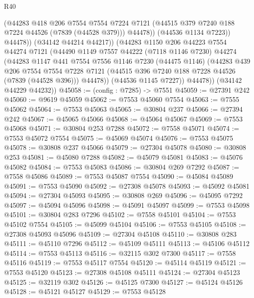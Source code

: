 \begin{lexlean}{R40}
\begin{coremodule}
                  (@44283
                    @418
                    @206
                    @7554
                    @7554
                    @7224
                    @7121
                    (@44515 @379 @7240 @188 @7224 @44526 (@7839 (@44528 @379)))
                    @44478))
                (@44536 @1134 @7223))
              @44478))
          (@34142 @44214 @44217))
        (@44283
          @1150
          @206
          @44223
          @7554
          @44274
          @7121
          (@44490
            @1149
            @7557
            @44222
            (@7118 @1146 @7230)
            @44274
            (@44283
              @1147
              @441
              @7554
              @7556
              @1146
              @7230
              (@44475 @1146)
              (@44283
                @439
                @206
                @7554
                @7554
                @7228
                @7121
                (@44515 @396 @7240 @188 @7228 @44526 (@7839 (@44528 @396)))
                @44478))
            (@44536 @1145 @7227))
          @44478))
      (@34142 @44229 @44232))
@45058 := (config : @7285) -> @7551
@45059 := @27391 @242
@45060 := @9619 @45059
@45062 := @7553 @45060 @7554
@45063 := @7555 @45062
@45064 := @7553 @45063
@45065 := @30804 @237
@45066 := @27394 @242
@45067 := @45065 @45066
@45068 := @45064 @45067
@45069 := @7553 @45068
@45071 := @30804 @253 @7288
@45072 := @7558 @45071
@45074 := @7553 @45072 @7554
@45075 := @45069 @45074
@45076 := @7553 @45075
@45078 := @30808 @237 @45066
@45079 := @27304 @45078
@45080 := @30808 @253
@45081 := @45080 @7288
@45082 := @45079 @45081
@45083 := @45076 @45082
@45084 := @7553 @45083
@45086 := @30804 @269 @7292
@45087 := @7558 @45086
@45089 := @7553 @45087 @7554
@45090 := @45084 @45089
@45091 := @7553 @45090
@45092 := @27308 @45078
@45093 := @45092 @45081
@45094 := @27304 @45093
@45095 := @30808 @269
@45096 := @45095 @7292
@45097 := @45094 @45096
@45098 := @45091 @45097
@45099 := @7553 @45098
@45101 := @30804 @283 @7296
@45102 := @7558 @45101
@45104 := @7553 @45102 @7554
@45105 := @45099 @45104
@45106 := @7553 @45105
@45108 := @27308 @45093 @45096
@45109 := @27304 @45108
@45110 := @30808 @283
@45111 := @45110 @7296
@45112 := @45109 @45111
@45113 := @45106 @45112
@45114 := @7553 @45113
@45116 := @32115 @302 @7300
@45117 := @7558 @45116
@45119 := @7553 @45117 @7554
@45120 := @45114 @45119
@45121 := @7553 @45120
@45123 := @27308 @45108 @45111
@45124 := @27304 @45123
@45125 := @32119 @302
@45126 := @45125 @7300
@45127 := @45124 @45126
@45128 := @45121 @45127
@45129 := @7553 @45128

\end{coremodule}
\end{lexlean}
